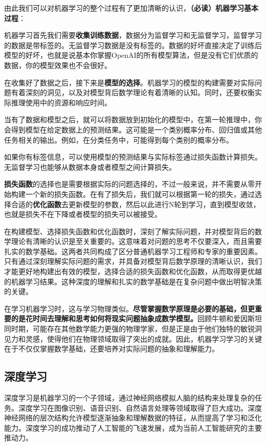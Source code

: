 由此我们可以对机器学习的整个过程有了更加清晰的认识，\textbf{（必读）机器学习基本过程}：

机器学习首先我们需要\textbf{收集训练数据}，数据分为监督学习和无监督学习，监督学习的数据是带标签的。无监督学习数据是没有标签的。数据的好坏直接决定了训练后模型的好坏，也就是说基本你掌握OpenAI的所有模型算法，但是没有它们优质的数据，你的模型效果也不会很好。

在收集好了数据之后，接下来是\textbf{模型的选择}。机器学习的模型的构建需要对实际问题有着深刻的洞见，以及对模型背后数学理论有着清晰的认知。同时，还要权衡实际推理使用中的资源和响应时间。

当有了数据和模型之后，就可以将数据放到初始化的模型中，在第一轮推理中，你会得到模型在给定数据上的预测结果。这可能是一个类别概率分布、回归值或其他任务相关的输出。例如，在分类任务中，可能得到每个类别的概率分布。

如果你有标签信息，可以使用模型的预测结果与实际标签通过损失函数计算损失。无监督学习也能够从数据本身或者模型之间计算损失。

\textbf{损失函数}的选择也是需要根据实际的问题选择的，不过一般来说，并不需要从零开始构建一个新的损失函数。在有了损失后，我们就可以根据第一轮的损失，通过选择合适的\textbf{优化函数}去更新模型的参数，然后以此进行N轮到学习，直到模型收敛，也就是损失不在下降或者模型的损失可以被接受。

在构建模型、选择损失函数和优化函数时，深刻了解实际问题，并对模型背后的数学理论有清晰的认识是至关重要的。这意味着对问题的思考不仅要深入，而且需要扎实的数学基础。这两者共同构成了区分普通机器学习工程师和专家的重要因素。只有通过深刻理解实际问题的需求，并具备对模型背后数学原理的清晰认识，我们才能更好地构建出有效的模型，选择合适的损失函数和优化函数，从而取得更优越的机器学习结果。这种深度的理解和扎实的数学基础是在复杂问题中做出明智决策的关键。

在学习机器学习时，这与学习物理类似。\textbf{尽管掌握数学原理是必要的基础，但更重要的是花时间去理解和思考如何将现实问题抽象成数学模型。}回顾牛顿和爱因斯坦同时期，可能存在其他数学能力更强的物理学家，但是正是由于他们独特的敏锐洞见力和灵感，使得他们在物理领域取得了突出的成就。因此，机器学习学习的关键在于不仅仅掌握数学基础，还要培养对实际问题的抽象和理解能力。

\subsection{深度学习}

深度学习是机器学习的一个子领域，通过神经网络模拟人脑的结构来处理复杂的任务。深度学习在图像识别、语音识别、自然语言处理等领域取得了巨大成功。深度神经网络的层次结构允许模型逐渐抽象和理解数据的特征，从而提高了学习和泛化能力。深度学习的成功推动了人工智能的飞速发展，成为当前人工智能研究的主要推动力。


